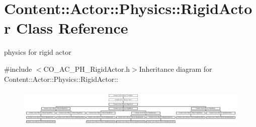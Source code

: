 \hypertarget{classContent_1_1Actor_1_1Physics_1_1RigidActor}{
\section{Content::Actor::Physics::RigidActor Class Reference}
\label{classContent_1_1Actor_1_1Physics_1_1RigidActor}
}


physics for rigid actor  


{\ttfamily \#include $<$CO\_\-AC\_\-PH\_\-RigidActor.h$>$}Inheritance diagram for Content::Actor::Physics::RigidActor::\begin{figure}[H]
\begin{center}
\leavevmode
\includegraphics[height=1.88552cm]{classContent_1_1Actor_1_1Physics_1_1RigidActor}
\end{center}
\end{figure}
